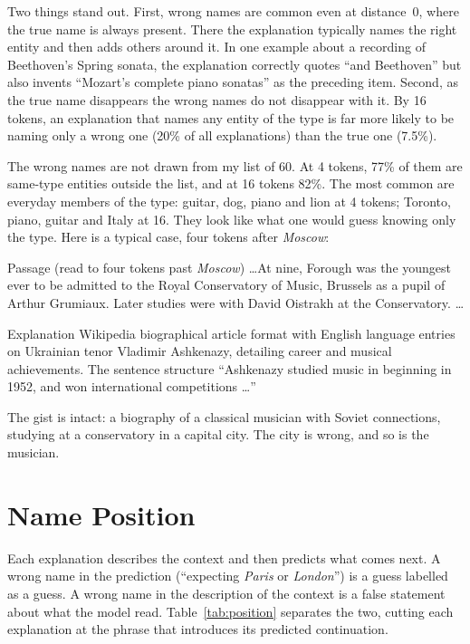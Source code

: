 Two things stand out. First, wrong names are common even at distance~0, where the true name is always
present. There the explanation typically names the right entity and then adds others around it. In one
example about a recording of Beethoven's Spring sonata, the explanation correctly quotes ``and Beethoven''
but also invents ``Mozart's complete piano sonatas'' as the preceding item. Second, as the true name
disappears the wrong names do not disappear with it. By 16 tokens, an explanation that names any entity of
the type is far more likely to be naming only a wrong one (20\% of all explanations) than the true one
(7.5\%).

The wrong names are not drawn from my list of 60. At 4 tokens, 77\% of them are same-type entities outside
the list, and at 16 tokens 82\%. The most common are everyday members of the type: guitar, dog, piano and
lion at 4 tokens; Toronto, piano, guitar and Italy at 16. They look like what one would guess knowing only
the type. Here is a typical case, four tokens after \emph{Moscow}:

\begin{sample}{Passage (read to four tokens past \emph{Moscow})}
\ldots At nine, Forough was the youngest ever to be admitted to the Royal Conservatory of Music, Brussels as
a pupil of Arthur Grumiaux. Later studies were with David Oistrakh at the  Conservatory. \ldots
\end{sample}

\begin{sample}{Explanation}
Wikipedia biographical article format with English language entries on Ukrainian tenor Vladimir Ashkenazy,
detailing career and musical achievements. The sentence structure ``Ashkenazy studied music in
 beginning in 1952, and won international competitions \ldots''
\end{sample}

The gist is intact: a biography of a classical musician with Soviet connections, studying at a conservatory
in a capital city. The city is wrong, and so is the musician.

\section{Name Position}

Each explanation describes the context and then predicts what comes next. A wrong name in the prediction
(``expecting \emph{Paris} or \emph{London}'') is a guess labelled as a guess. A wrong name in the description
of the context is a false statement about what the model read. Table~\ref{tab:position} separates the two,
cutting each explanation at the phrase that introduces its predicted continuation.

